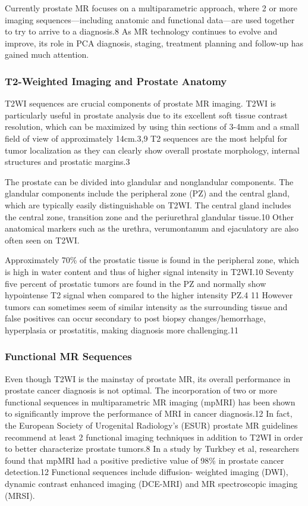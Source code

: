  Currently prostate MR focuses on a multiparametric approach, where 2 or more imaging sequences—including anatomic and functional data—are used together to try to arrive to a diagnosis.8 As MR technology continues to evolve and improve, its role in PCA diagnosis, staging, treatment planning and follow-up has gained much attention.

\subsubsection{T2-Weighted Imaging and Prostate Anatomy}
 T2WI sequences are crucial components of prostate MR imaging.  T2WI is particularly useful in prostate analysis due to its excellent soft tissue contrast resolution, which can be maximized by using thin sections of 3-4mm and a small field of view of approximately 14cm.3,9 T2 sequences are the most helpful for tumor localization as they can clearly show overall prostate morphology, internal structures and prostatic margins.3

 The prostate can be divided into glandular and nonglandular components. The glandular components include the peripheral zone (PZ) and the central gland, which are typically easily distinguishable on T2WI. The central gland includes the central zone, transition zone and the periurethral glandular tissue.10 Other anatomical markers such as the urethra, verumontanum and ejaculatory are also often seen on T2WI. 

 Approximately 70\% of the prostatic tissue is found in the peripheral zone, which is high in water content and thus of higher signal intensity in T2WI.10 Seventy five percent of prostatic tumors are found in the PZ and normally show hypointense T2 signal when compared to the higher intensity PZ.4 11 However tumors can sometimes seem of similar intensity as the surrounding tissue and false positives can occur secondary to post biopsy changes/hemorrhage, hyperplasia or prostatitis, making diagnosis more challenging.11 

\subsubsection{Functional MR Sequences}
 Even though T2WI is the mainstay of prostate MR, its overall performance in prostate cancer diagnosis is not optimal. The incorporation of two or more functional sequences in multiparametric MR imaging (mpMRI) has been shown to significantly improve the performance of MRI in cancer diagnosis.12 In fact, the European Society of Urogenital Radiology’s (ESUR) prostate MR guidelines recommend at least 2 functional imaging techniques in addition to T2WI in order to better characterize prostate tumors.8 In a study by Turkbey et al, researchers found that mpMRI had a positive predictive value of 98\% in prostate cancer detection.12 Functional sequences include diffusion- weighted imaging (DWI), dynamic contrast enhanced imaging (DCE-MRI) and MR spectroscopic imaging (MRSI). 

